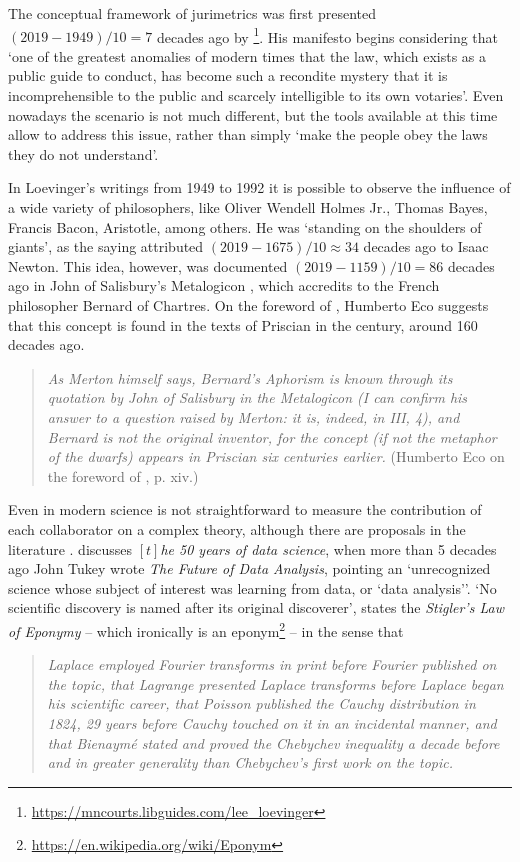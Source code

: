 \documentclass[a4paper]{exam}
\theoremstyle{plain}
\begin{document}
The conceptual framework of jurimetrics was first presented $(2019-1949)/10 = 7$ decades ago by \cite{loevinger1949jurimetrics}\footnote{ \url{https://mncourts.libguides.com/lee_loevinger}}. His manifesto begins considering that `one of the greatest anomalies of modern times that the law, which exists as a public guide to conduct, has become such a recondite mystery that it is incomprehensible to the public and scarcely intelligible to its own votaries'. Even nowadays the scenario is not much different, but the tools available at this time allow to address this issue, rather than simply  `make the people obey the laws they do not understand'. 

In Loevinger's writings from 1949 to 1992 it is possible to observe the influence of a wide variety of philosophers, like Oliver Wendell Holmes Jr., Thomas Bayes, Francis Bacon, Aristotle, among others. He was `standing on the shoulders of giants', as the saying attributed $(2019-1675)/10 \approx 34$ decades ago to Isaac Newton. This idea, however, was documented $(2019-1159)/10 = 86$ decades ago in John of Salisbury's Metalogicon \cite{salisbury2009metalogicon}, which accredits to the French philosopher Bernard of Chartres. On the foreword of \cite{merton1993shoulders}, Humberto Eco suggests that this concept is found in the texts of Priscian in the  century, around 160 decades ago.

\begin{quote}
\textit{As Merton himself says, Bernard's Aphorism is known through its quotation by John of Salisbury in the Metalogicon (I can confirm his answer to a question raised by Merton: it is, indeed, in III, 4), and Bernard is not the original inventor, for the concept (if not the metaphor of the dwarfs) appears in Priscian six centuries earlier.} (Humberto Eco on the foreword of \cite{merton1993shoulders}, p. xiv.)
\end{quote}

Even in modern science is not straightforward to measure the contribution of each collaborator on a complex theory, although there are proposals in the literature \cite{winston1985suggested}. \cite{donoho201550years} discusses \textit{$\left[t\right]$he 50 years of data science}, when more than 5 decades ago John Tukey wrote \textit{The Future of Data Analysis}, pointing an `unrecognized science whose subject of interest was learning from data, or `data analysis''. `No scientific discovery is named after its original discoverer', states the \textit{Stigler's Law of Eponymy} \cite{stigler1980stigler} -- which ironically is an eponym\footnote{ \url{https://en.wikipedia.org/wiki/Eponym}} -- in the sense that
\begin{quote}

\textit{Laplace employed Fourier transforms in print before Fourier published on the topic, that Lagrange presented Laplace transforms before Laplace began his scientific career, that Poisson published the Cauchy distribution in 1824, 29 years before Cauchy touched on it in an incidental manner, and that Bienaymé stated and proved the Chebychev inequality a decade before and in greater generality than Chebychev’s first work on the topic.} \cite[p. 148]{stigler1980stigler}
\end{quote}
\end{document}
